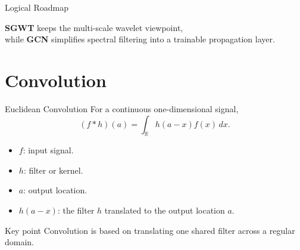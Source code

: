 \documentclass[aspectratio=1610,xcolor=dvipsnames,t]{beamer}
\newcommand{\R}{\mathbb{R}}
\begin{document}
\begin{frame}{Logical Roadmap}
{
}

\vspace{0.35cm}

\begin{center}
\small
{\Large\textbf{\color{unirot}SGWT}} keeps the multi-scale wavelet viewpoint,\\[1mm]
while {\Large\textbf{\color{unirot}GCN}} simplifies spectral filtering into a trainable propagation layer.
\end{center}

\end{frame}

\section[Convolution]{Convolution}

\begin{frame}{Euclidean Convolution}
For a continuous one-dimensional signal,
\[
(f*h)(a)=\int_{\R} h(a-x)f(x)\,dx.
\]

\begin{itemize}
  \item $f$: input signal.
  \item $h$: filter or kernel.
  \item $a$: output location.
  \item $h(a-x)$: the filter $h$ translated to the output location $a$.
\end{itemize}

\begin{block}{Key point}
Convolution is based on translating one shared filter across a regular domain.
\end{block}
\end{frame}
\end{document}
